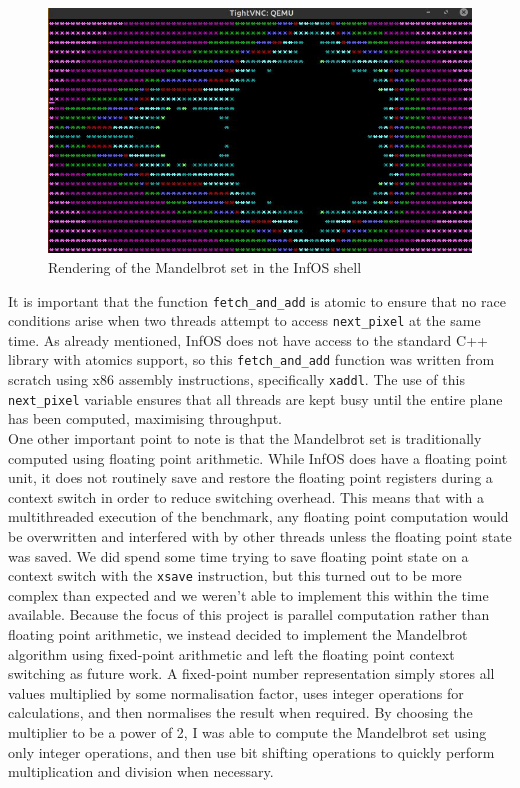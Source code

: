 \documentclass[bsc,frontabs,singlespacing,parskip,deptreport]{infthesis}
\begin{document}
\begin{figure}[h]
    \centering
    \includegraphics[scale=0.8]{figures/terminal-output.jpg}
    \caption{Rendering of the Mandelbrot set in the InfOS shell}
    \label{terminal-output}
\end{figure}

It is important that the function \verb|fetch_and_add| is atomic to ensure that no race conditions arise when two threads attempt to access \verb|next_pixel| at the same time. As already mentioned, InfOS does not have access to the standard C++ library with atomics support, so this \verb|fetch_and_add| function was written from scratch using x86 assembly instructions, specifically \verb|xaddl|. The use of this \verb|next_pixel| variable ensures that all threads are kept busy until the entire plane has been computed, maximising throughput. \\

One other important point to note is that the Mandelbrot set is traditionally computed using floating point arithmetic. While InfOS does have a floating point unit, it does not routinely save and restore the floating point registers during a context switch in order to reduce switching overhead. This means that with a multithreaded execution of the benchmark, any floating point computation would be overwritten and interfered with by other threads unless the floating point state was saved. We did spend some time trying to save floating point state on a context switch with the \verb|xsave| instruction, but this turned out to be more complex than expected and we weren't able to implement this within the time available. Because the focus of this project is parallel computation rather than floating point arithmetic, we instead decided to implement the Mandelbrot algorithm using fixed-point arithmetic and left the floating point context switching as future work. A fixed-point number representation simply stores all values multiplied by some normalisation factor, uses integer operations for calculations, and then normalises the result when required. By choosing the multiplier to be a power of 2, I was able to compute the Mandelbrot set using only integer operations, and then use bit shifting operations to quickly perform multiplication and division when necessary.
\end{document}
